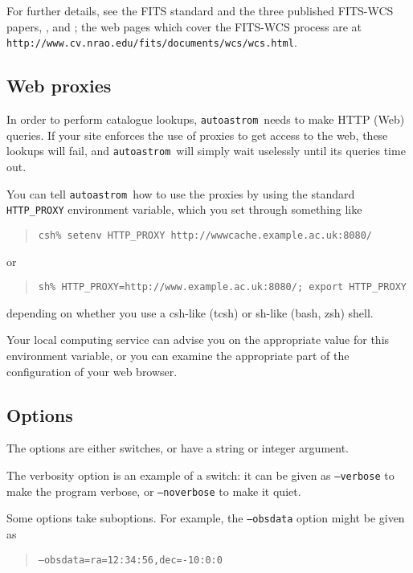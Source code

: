 \documentclass[twoside,11pt]{article}
\newcommand{\xlabel}[1]{}
\newcommand{\autoastrom}{\texttt{autoastrom}}
\begin{document}
For further details, see the FITS standard \cite{nost-100-2} and the three
published FITS-WCS papers, \cite[FITS WCS Paper I]{fitswcs1}, \cite[FITS WCS
Paper II]{fitswcs2} and \cite[FITS WCS Paper III]{fitswcs3}; the web pages
which cover the FITS-WCS process are at
\texttt{http://www.cv.nrao.edu/fits/documents/wcs/wcs.html}.

\subsection{\xlabel{sb_webproxies}Web proxies\label{sb:webproxies}}

In order to perform catalogue lookups, \autoastrom\ needs to make HTTP (Web)
queries.  If your site enforces the use of proxies to get access to the web,
these lookups will fail, and \autoastrom\ will simply wait uselessly until its
queries time out.

You can tell \autoastrom\ how to use the proxies by using the standard
\texttt{HTTP\_PROXY} environment variable, which you set through something
like

\begin{quote}
  \texttt{csh\% setenv HTTP\_PROXY http://wwwcache.example.ac.uk:8080/}
\end{quote}
or
\begin{quote}
  \texttt{sh\% HTTP\_PROXY=http://www.example.ac.uk:8080/; export HTTP\_PROXY}
\end{quote}
depending on whether you use a csh-like (tcsh) or sh-like (bash, zsh) shell.

Your local computing service can advise you on the appropriate value for this
environment variable, or you can examine the appropriate part of the
configuration of your web browser.

\subsection{\xlabel{sb_options}Options\label{sb:options}}

The options are either switches, or have a string or integer argument.

The verbosity option is an example of a switch: it can be given as
\texttt{--verbose} to make the program verbose, or \texttt{--noverbose} to
make it quiet.

Some options take suboptions.  For example, the \texttt{--obsdata} option
might be given as

\begin{quote}
  \texttt{--obsdata=ra=12:34:56,dec=-10:0:0}
\end{quote}
\end{document}
